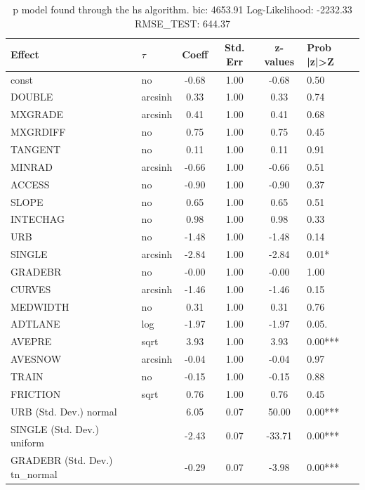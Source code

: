 \begin{table}
	\caption{p model found through the hs algorithm. bic: 4653.91 Log-Likelihood: -2232.33 RMSE_TEST: 644.37}
	\begin{center}
		\begin{tabular}{|l|l|c|c|c|l|}
			\hline
			Effect & $\tau$ & Coeff & Std. Err & z-values & Prob |z|>Z \\
			\hline
			const & no & -0.68 & 1.00 & -0.68 & 0.50 \\
			\hline
			DOUBLE & arcsinh & 0.33 & 1.00 & 0.33 & 0.74 \\
			\hline
			MXGRADE & arcsinh & 0.41 & 1.00 & 0.41 & 0.68 \\
			\hline
			MXGRDIFF & no & 0.75 & 1.00 & 0.75 & 0.45 \\
			\hline
			TANGENT & no & 0.11 & 1.00 & 0.11 & 0.91 \\
			\hline
			MINRAD & arcsinh & -0.66 & 1.00 & -0.66 & 0.51 \\
			\hline
			ACCESS & no & -0.90 & 1.00 & -0.90 & 0.37 \\
			\hline
			SLOPE & no & 0.65 & 1.00 & 0.65 & 0.51 \\
			\hline
			INTECHAG & no & 0.98 & 1.00 & 0.98 & 0.33 \\
			\hline
			URB & no & -1.48 & 1.00 & -1.48 & 0.14 \\
			\hline
			SINGLE & arcsinh & -2.84 & 1.00 & -2.84 & 0.01* \\
			\hline
			GRADEBR & no & -0.00 & 1.00 & -0.00 & 1.00 \\
			\hline
			CURVES & arcsinh & -1.46 & 1.00 & -1.46 & 0.15 \\
			\hline
			MEDWIDTH & no & 0.31 & 1.00 & 0.31 & 0.76 \\
			\hline
			ADTLANE & log & -1.97 & 1.00 & -1.97 & 0.05. \\
			\hline
			AVEPRE & sqrt & 3.93 & 1.00 & 3.93 & 0.00*** \\
			\hline
			AVESNOW & arcsinh & -0.04 & 1.00 & -0.04 & 0.97 \\
			\hline
			TRAIN & no & -0.15 & 1.00 & -0.15 & 0.88 \\
			\hline
			FRICTION & sqrt & 0.76 & 1.00 & 0.76 & 0.45 \\
			\hline
			URB (Std. Dev.) normal &  & 6.05 & 0.07 & 50.00 & 0.00*** \\
			\hline
			SINGLE (Std. Dev.) uniform &  & -2.43 & 0.07 & -33.71 & 0.00*** \\
			\hline
			GRADEBR (Std. Dev.) tn_normal &  & -0.29 & 0.07 & -3.98 & 0.00*** \\

\end{tabular}
\end{center}
\end{table}
